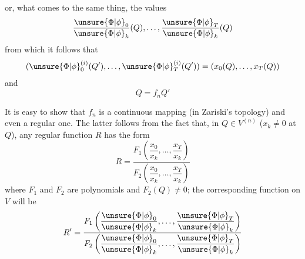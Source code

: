 or, what comes to the same thing, the values
\[
\frac{\unsure{\Phi|\phi}_0}{\unsure{\Phi|\phi}_k}(Q),\ldots,\frac{\unsure{\Phi|\phi}_T}{\unsure{\Phi|\phi}_k}(Q)
\]
from which it follows that
\[
(\unsure{\Phi|\phi}_0^{(i)}(Q'),\ldots,\unsure{\Phi|\phi}_T^{(i)}(Q'))=(x_0(Q),\ldots,x_T(Q))
\]
 and
\[
Q=f_nQ'
\]

It is easy to show that $f_n$ is a continuous mapping (in Zariski's topology) and even a regular one. The latter follows from the fact that, in $Q\in V^{(n)}$ ($x_k\ne0$ at $Q$), any regular function $R$ has the form
\[
R=\frac{F_1\left(\dfrac{x_0}{x_k},\ldots,\dfrac{x_T}{x_k}\right)}{F_2\left(\dfrac{x_0}{x_k},\ldots,\dfrac{x_T}{x_k}\right)}
\]
where $F_1$ and $F_2$ are polynomials and $F_2(Q)\ne0$; the corresponding function on $V$ will be
\[
R'=\frac{F_1\left(\dfrac{\unsure{\Phi|\phi}_0}{\unsure{\Phi|\phi}_k},\ldots,\dfrac{\unsure{\Phi|\phi}_T}{\unsure{\Phi|\phi}_k}\right)}{F_2\left(\dfrac{\unsure{\Phi|\phi}_0}{\unsure{\Phi|\phi}_k},\ldots,\dfrac{\unsure{\Phi|\phi}_T}{\unsure{\Phi|\phi}_k}\right)}
\]
